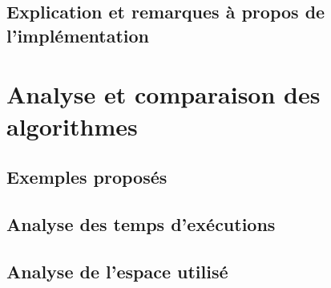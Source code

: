 \documentclass{article}
\begin{document}
    \subsection{Explication et remarques à propos de l'implémentation}


    \section{Analyse et comparaison des algorithmes}
    \subsection{Exemples proposés}
    \subsection{Analyse des temps d'exécutions}
    \subsection{Analyse de l'espace utilisé}
\end{document}
